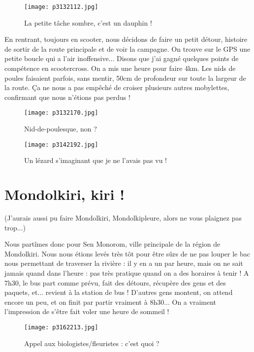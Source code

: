 \documentclass{book}
\begin{document}
\begin{figure}[h]
\centering
\texttt{[image: p3132112.jpg]}
\caption*{La petite tâche sombre, c'est un dauphin !}
\end{figure}

En rentrant, toujours en scooter, nous décidons de faire un petit détour, histoire de sortir de la route principale et de voir la campagne. On trouve sur le GPS une petite boucle qui a l'air inoffensive... Disons que j'ai gagné quelques points de compétence en scootercross. On a mis une heure pour faire 4km. Les nids de poules faisaient parfois, sans mentir, 50cm de profondeur sur toute la largeur de la route. Ça ne nous a pas empêché de croiser plusieurs autres mobylettes, confirmant que nous n'étions pas perdus !


\begin{figure}[h]
\centering
\texttt{[image: p3132170.jpg]}
\caption*{Nid-de-poulesque, non ?}
\end{figure}


\begin{figure}[h]
\centering
\texttt{[image: p3142192.jpg]}
\caption*{Un lézard s'imaginant que je ne l'avais pas vu !}
\end{figure}



\chapter{Mondolkiri, kiri !}
(J'aurais aussi pu faire Mondolkiri, Mondolkipleure, alors ne vous plaignez pas trop...)

Nous partîmes donc pour Sen Monorom, ville principale de la région de Mondolkiri. Nous nous étions levés très tôt pour être sûrs de ne pas louper le bac nous permettant de traverser la rivière : il y en a un par heure, mais on ne sait jamais quand dans l'heure : pas très pratique quand on a des horaires à tenir ! A 7h30, le bus part comme prévu, fait des détours, récupère des gens et des paquets, et... revient à la station de bus ! D'autres gens montent, on attend encore un peu, et on finit par partir vraiment à 8h30... On a vraiment l'impression de s'être fait voler une heure de sommeil !


\begin{figure}[h]
\centering
\texttt{[image: p3162213.jpg]}
\caption*{Appel aux biologistes/fleuristes : c'est quoi ?}
\end{figure}
\end{document}
